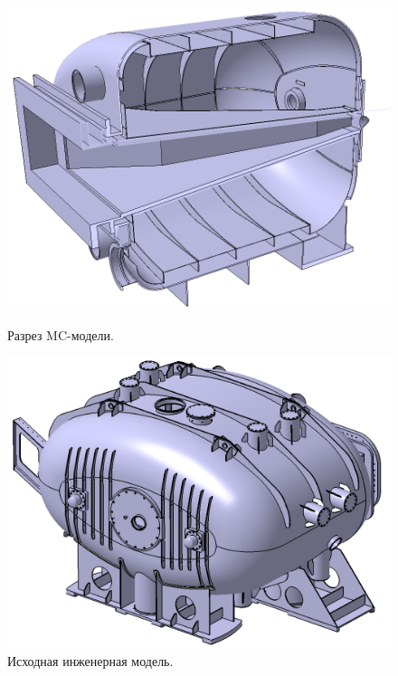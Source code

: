 \begin{figure}[H]
\begin{minipage}[b]{0.49\textwidth}
\includegraphics[width=1.0\textwidth]{pictures/GLAD3.png}
\caption{Разрез MC-модели.}
\label{fig:GLAD3}
\end{minipage}
\hspace{0.01\textwidth}
\begin{minipage}[b]{0.49\textwidth}
\includegraphics[width=1.0\textwidth]{pictures/R3B_GLAD_CAD.png}
\caption{Исходная инженерная модель.}
\label{fig:GLAD4}
\end{minipage}
\end{figure}


